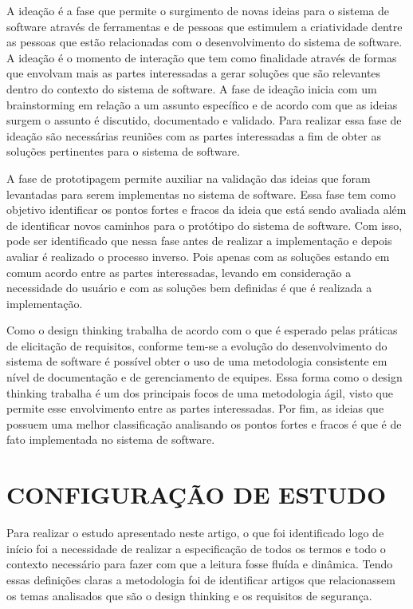 \documentclass[a4paper,twoside]{article}
\begin{document}
A ideação é a fase que permite o surgimento de novas ideias para o sistema de software através de ferramentas e de pessoas que estimulem a criatividade dentre as pessoas que estão relacionadas com o desenvolvimento do sistema de software. A ideação é o momento de interação que tem como finalidade através de formas que envolvam mais as partes interessadas a gerar soluções que são relevantes dentro do contexto do sistema de software. A fase de ideação inicia com um brainstorming em relação a um assunto específico e de acordo com que as ideias surgem o assunto é discutido, documentado e validado. Para realizar essa fase de ideação são necessárias reuniões com as partes interessadas a fim de obter as soluções pertinentes para o sistema de software\cite{DBLP:journals/information/MartinsJCKPO19}.

A fase de prototipagem permite auxiliar na validação das ideias que foram levantadas para serem implementas no sistema de software. Essa fase tem como objetivo identificar os pontos fortes e fracos da ideia que está sendo avaliada além de identificar novos caminhos para o protótipo do sistema de software. Com isso, pode ser identificado que nessa fase antes de realizar a implementação e depois avaliar é realizado o processo inverso. Pois apenas com as soluções estando em comum acordo entre as partes interessadas, levando em consideração a necessidade do usuário e com as soluções bem definidas é que é realizada a implementação. 

Como o design thinking trabalha de acordo com o que é esperado pelas práticas de elicitação de requisitos, conforme tem-se a evolução do desenvolvimento do sistema de software é possível obter o uso de uma metodologia consistente em nível de documentação e de gerenciamento de equipes. Essa forma como o design thinking trabalha é um dos principais focos de uma metodologia ágil, visto que permite esse envolvimento entre as partes interessadas. Por fim, as ideias que possuem uma melhor classificação analisando os pontos fortes e fracos é que é de fato implementada no sistema de software\cite{DBLP:journals/information/MartinsJCKPO19}.

\section{\uppercase{Configuração de Estudo}}


Para realizar o estudo apresentado neste artigo, o que foi identificado logo de início foi a necessidade de realizar a especificação de todos os termos e todo o contexto necessário para fazer com que a leitura fosse fluída e dinâmica. Tendo essas definições claras a metodologia foi de identificar artigos que relacionassem os temas analisados que são o design thinking e os requisitos de segurança.
\end{document}

